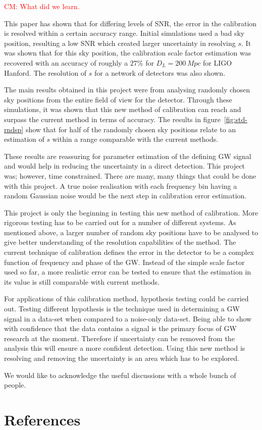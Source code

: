 \documentclass[12pt]{iopart}
\newcommand{\cm}[1]{\textcolor{red}{CM: #1}}
\begin{document}
\cm{What did we learn.}

This paper has shown that for differing levels of SNR, the error in the
calibration is resolved within a certain accuracy range. Initial simulations
used a bad sky position, resulting a low SNR which created larger uncertainty
in resolving $s$. It was shown that for this sky position, the calibration
scale factor estimation was recovered with an accuracy of roughly a $27\%$ for
$D_{L} = 200\,Mpc$ for LIGO Hanford. The resolution of $s$ for a network of
detectors was also shown.

The main results obtained in this project were from analysing randomly chosen
sky positions from the entire field of view for the detector. Through these
simulations, it was shown that this new method of calibration can reach and
surpass the current method in terms of accuracy. The results in
figure~\ref{fig:std-rndsp} show that for half of the randomly chosen sky
positions relate to an estimation of $s$ within a range comparable with the
current methods.

These results are reassuring for parameter estimation of the defining GW signal
and would help in reducing the uncertainty in a direct detection. This project
was; however, time constrained. There are many, many things that could be done
with this project. A true noise realisation with each frequency bin having a
random Gaussian noise would be the next step in calibration error estimation.

This project is only the beginning in testing this new method of calibration.
More rigorous testing has to be carried out for a number of different systems.
As mentioned above, a larger number of random sky positions have to be analysed
to give better understanding of the resolution capabilities of the method. The
current technique of calibration defines the error in the detector to be a
complex function of frequency and phase of the GW. Instead of the simple scale
factor used so far, a more realistic error can be tested to ensure that the
estimation in its value is still comparable with current methods.


For applications of this calibration method, hypothesis testing could be
carried out. Testing different hypothesis is the technique used in determining
a GW signal in a data-set when compared to a noise-only data-set. Being able to
show with confidence that the data contains a signal is the primary focus of GW
research at the moment. Therefore if uncertainty can be removed from the
analysis this will ensure a more confident detection. Using this new method is
resolving and removing the uncertainty is an area which has to be explored.

\ack

We would like to acknowledge the useful discussions with a whole bunch
of people.

\section*{References}



\end{document}
